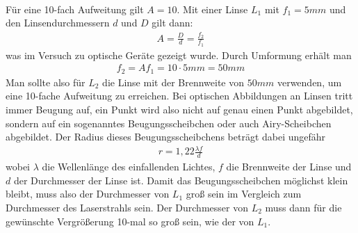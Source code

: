 \documentclass[a4paper,10pt]{scrartcl}
\begin{document}
			\\
			Für eine 10-fach Aufweitung gilt \(A=10\). Mit einer Linse \(L_{1}\) mit \(f_{1}=5mm\) und den Linsendurchmessern \(d\) und \(D\) gilt dann:
			\begin{align*}
			A=\frac{D}{d}=\frac{f_{2}}{f_{1}}
			\end{align*}
			was im Versuch zu optische Geräte gezeigt wurde. Durch Umformung erhält man
			\begin{align*}
			f_{2}=Af_{1}=10 \cdot 5mm=50mm
			\end{align*}
			Man sollte also für \(L_{2}\) die Linse mit der Brennweite von \(50mm\) verwenden, um eine 10-fache Aufweitung zu erreichen. Bei optischen Abbildungen an Linsen tritt immer Beugung auf, ein Punkt wird also nicht auf genau einen Punkt abgebildet, sondern auf ein sogenanntes Beugungsscheibchen oder auch Airy-Scheibchen abgebildet. Der Radius dieses Beugungsscheibchens beträgt dabei ungefähr
			\begin{align*}
			r=1,22\frac{\lambda f}{d}
			\end{align*}
			wobei \(\lambda\) die Wellenlänge des einfallenden Lichtes, \(f\) die Brennweite der Linse und \(d\) der Durchmesser der Linse ist. Damit das Beugungsscheibchen möglichst klein bleibt, muss also der Durchmesser von \(L_{1}\) groß sein im Vergleich zum Durchmesser des Laserstrahls sein. Der Durchmesser von \(L_{2}\) muss dann für die gewünschte Vergrößerung 10-mal so groß sein, wie der von \(L_{1}\).
			
\end{document}
